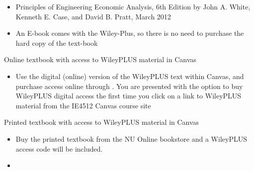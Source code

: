 \documentclass[letterpaper]{inzane_syllabus} %
\begin{document}
\begin{itemize}[label= \color{myCOLOR}{$\RHD$}]
    \item Principles of Engineering Economic Analysis, 6th Edition by John A. White, Kenneth E. Case, and David B. Pratt, March 2012  \href{https://www.amazon.com/Principles-Engineering-Economic-Analysis-White/dp/1118163834}{}
    \item \color{red}{Note:} \color{black} {An E-book comes with the Wiley-Plus, so there is no need to purchase the hard copy of the text-book}
\end{itemize}

 
    \item Online textbook with access to WileyPLUS material in Canvas 
        \begin{itemize}[label= \color{myCOLOR}{$\circ$}]
            \item Use the digital (online) version of the WileyPLUS text within Canvas, and purchase access online through 
            \href{www.wileyplus.com}{}. You are presented with the option to buy WileyPLUS digital access the first time you click on a link to WileyPLUS material from the IE4512 Canvas course site
        \end{itemize}
    \item Printed textbook with access to WileyPLUS material in Canvas
        \begin{itemize}[label= \color{myCOLOR}{$\circ$}]
            \item Buy the printed textbook from the NU Online bookstore and a WileyPLUS access code will be included. 
            \item \color{red}{DO NOT THROW THIS CODE AWAY.}
        \end{itemize}
\vspace{0.1cm}
\end{document}
